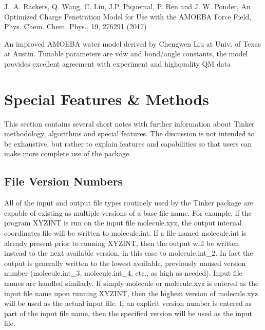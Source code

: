 \documentclass[letterpaper,11pt,english]{sphinxmanual}
\begin{document}
\sphinxAtStartPar
J. A. Rackers, Q. Wang, C. Liu, J.\sphinxhyphen{}P. Piquemal, P. Ren and J. W. Ponder, An Optimized Charge Penetration Model for Use with the AMOEBA Force Field, Phys. Chem. Chem. Phys., 19, 276\sphinxhyphen{}291 (2017)

\sphinxAtStartPar
{}

\sphinxAtStartPar
An improved AMOEBA water model derived by Chengwen Liu at Univ. of Texas at Austin. Tunable parameters are vdw and bond/angle constants, the model provides
excellent agreement with experiment and high\sphinxhyphen{}quality QM data

\sphinxstepscope


\chapter{Special Features \& Methods}
\label{\detokenize{text/special-features:special-features-methods}}\label{\detokenize{text/special-features::doc}}
\sphinxAtStartPar
This section contains several short notes with further information about Tinker methodology, algorithms and special features. The discussion is not intended to be exhaustive, but rather to explain features and capabilities so that users can make more complete use of the package.


\section{File  Version Numbers}
\label{\detokenize{text/special-features:file-version-numbers}}
\sphinxAtStartPar
All of the input and output file types routinely used by the Tinker package are capable of existing as multiple versions of a base file name. For example, if the program XYZINT is run on the input file molecule.xyz, the output internal coordinates file will be written to molecule.int. If a file named molecule.int is already present prior to running XYZINT, then the output will be written instead to the next available version, in this case to molecule.int\_2. In fact the output is generally written to the lowest available, previously unused version number (molecule.int\_3, molecule.int\_4, etc., as high as needed). Input file names are handled similarly. If simply molecule or molecule.xyz is entered as the input file name upon running XYZINT, then the highest version of molecule.xyz will be used as the actual input file. If an explicit version number is entered as part of the input file name, then the specified version will be used as the input file.
\end{document}
